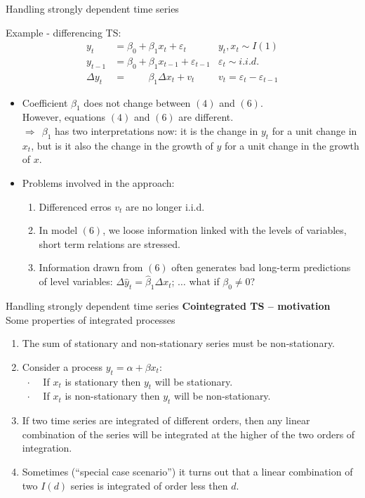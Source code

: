 \documentclass{beamer}
\begin{document}
\begin{frame}{Handling strongly dependent time series}
\vspace{-0.5cm}
\begin{block}{Example - differencing TS: }
\vspace{-0.5cm}
\begin{align} 
y_t & = \beta_0 + \beta_1 x_t + \varepsilon_t & y_t, x_t \sim I(1) \\
y_{t-1} & = \beta_0 + \beta_1 x_{t-1} + \varepsilon_{t-1} & \varepsilon_t \sim i.i.d. \\
\Delta y_t & = \qquad \, \beta_1\Delta x_t + v_t  & v_t= \varepsilon_t - \varepsilon_{t-1}
\end{align}
\end{block}
\begin{itemize}
\item Coefficient $\beta_1$ does not change between $(4)$ and $(6)$.
\\ However, equations $(4)$ and $(6)$ are different.
\\$\Rightarrow~~\beta_1$ has two interpretations now: it is the change in $y_t$ for a unit change in $x_t$, but is it also the change in the growth of $y$ for a unit change in the growth of $x$.
\item Problems involved in the approach: 
\begin{enumerate}
\item Differenced erros $v_t$ are no longer i.i.d.
\item In model $(6)$, we loose information linked with the levels of variables, short term relations are stressed.
\item Information drawn from $(6)$ often generates bad long-term predictions of level variables: 
$ \Delta \hat{y}_t = \hat{\beta}_1 \Delta x_t$; $ \dots $ what if $\beta_0 \neq 0$? 
\end{enumerate}
\end{itemize}
\end{frame}
\begin{frame}{Handling strongly dependent time series}
\textbf{Cointegrated TS -- motivation}\\ \medskip
Some properties of integrated processes
\medskip
\begin{enumerate}
\item The sum of stationary and non-stationary series must be non-stationary.
\medskip
\item Consider a process $y_t=\alpha + \beta x_t$:\\
~$\cdot$~~ If $x_t$ is stationary then $y_t$ will be stationary. \\
~$\cdot$~~ If $x_t$ is non-stationary then $y_t$ will be non-stationary. 
\medskip
\item If two time series are integrated of different orders, then any linear combination of the series will be integrated at the higher of the two orders of integration. 
\medskip
\item Sometimes (``special case scenario'') it turns out that a linear combination of two $I(d)$ series is integrated of order less then $d$. 
\end{enumerate}
\end{frame}
\end{document}
